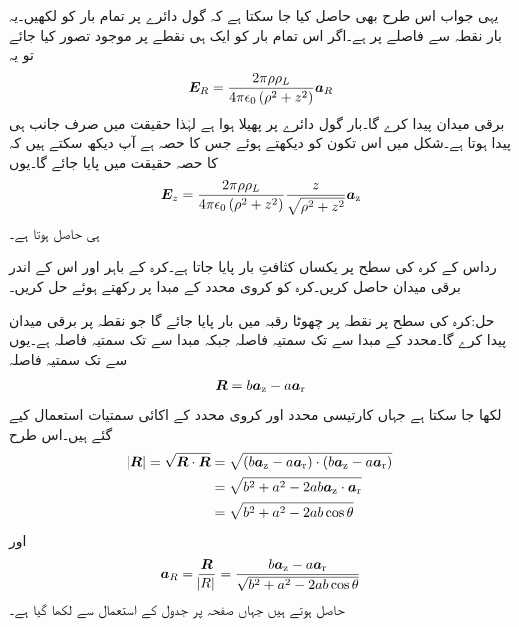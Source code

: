 یہی جواب اس طرح بھی حاصل کیا جا سکتا ہے کہ گول دائرے پر تمام بار کو  لکھیں۔یہ بار نقطہ  سے  فاصلے پر ہے۔اگر اس تمام بار کو ایک ہی نقطے   پر موجود تصور کیا جائے تو یہ
\begin{align*}
{\ensuremath{{\boldsymbol{E}}}}_R=\frac{2\pi\rho\rho_L}{4\pi\epsilon_0 \left(\rho^2+z^2 \right)} {{\boldsymbol{a}}}_R
\end{align*}
برقی میدان پیدا کرے گا۔بار گول دائرے پر پھیلا ہوا ہے لہٰذا حقیقت میں صرف  جانب ہی  پیدا ہوتا ہے۔شکل میں اس تکون کو دیکھتے ہوئے جس کا  حصہ ہے  آپ دیکھ سکتے ہیں کہ  کا  حصہ  حقیقت میں پایا جائے گا۔یوں 
\begin{align*}
{\ensuremath{{\boldsymbol{E}}}}_z=\frac{2\pi\rho\rho_L}{4\pi\epsilon_0 \left(\rho^2+z^2 \right)} \frac{z}{\sqrt{\rho^2+z^2}} {\boldsymbol{a}}_{\textup{z}}
\end{align*}
ہی حاصل ہوتا ہے۔

رداس  کے کرہ کی سطح پر یکساں کثافتِ بار  پایا جاتا ہے۔کرہ کے باہر اور اس کے اندر برقی میدان   حاصل کریں۔کرہ کو کروی محدد کے مبدا پر رکھتے ہوئے حل کریں۔

حل:کرہ کی سطح پر نقطہ  پر چھوٹا رقبہ  میں بار  پایا جائے گا جو  نقطہ  پر برقی میدان  پیدا کرے گا۔محدد کے مبدا سے  تک سمتیہ فاصلہ  جبکہ مبدا سے  تک سمتیہ فاصلہ  ہے۔یوں  سے  تک سمتیہ فاصلہ 
\begin{align}
{\ensuremath{{\boldsymbol{R}}}}=b{\boldsymbol{a}}_{\textup{z}}-a{\boldsymbol{a}}_{\textup{r}}
\end{align}
لکھا جا سکتا ہے جہاں کارتیسی محدد اور کروی محدد کے اکائی سمتیات استعمال کیے گئے ہیں۔اس طرح
\begin{gather}
\begin{aligned}
\abs{{{\boldsymbol{R}}}}=\sqrt{{{\boldsymbol{R}}} \cdot {\ensuremath{{\boldsymbol{R}}}}}&= \sqrt{(b{\boldsymbol{a}}_{\textup{z}}-a{\boldsymbol{a}}_{\textup{r}})\cdot (b{\boldsymbol{a}}_{\textup{z}}-a{\boldsymbol{a}}_{\textup{r}})}\\
&=\sqrt{b^2+a^2-2 ab {\boldsymbol{a}}_{\textup{z}} \cdot {\boldsymbol{a}}_{\textup{r}}}\\
&=\sqrt{b^2+a^2-2 ab \cos \theta}
\end{aligned}
\end{gather}
اور
\begin{align}
{\ensuremath{{\boldsymbol{a}}}}_R=\frac{{{\boldsymbol{R}}}}{\abs{R}}=\frac{b{\boldsymbol{a}}_{\textup{z}}-a{\boldsymbol{a}}_{\textup{r}}}{\sqrt{b^2+a^2-2 ab \cos \theta}}
\end{align}
حاصل ہوتے ہیں جہاں صفحہ  پر جدول  کے استعمال سے  لکھا گیا ہے۔

